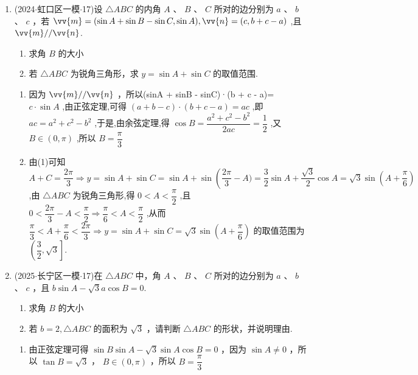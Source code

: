 \begin{enumerate}
    \item (2024$\cdot$虹口区一模$\cdot$17)设 $\bigtriangleup  {ABC}$ 的内角 $A$ 、 $B$ 、 $C$ 所对的边分别为 $a$ 、 $b$ 、 $c$ ，若 $\vv{m} = (\sin A + \sin B - \sin C,\sin A),\vv{n} = \left( {c,b + c - a}\right)$ ,且 $\vv{m}//\vv{n}$.
    \begin{enumerate}
        \item 求角 $B$ 的大小
        \item 若 $\bigtriangleup  {ABC}$ 为锐角三角形，求 $y = \sin A + \sin C$ 的取值范围.
    \end{enumerate}
    \begin{jieda}
        \begin{enumerate}
            \item 因为 $\vv{m}//\vv{n}$ ，所以(sinA + sinB - sinC)·(b + c - a)= $c \cdot  \sin A$ ,由正弦定理,可得 $\left( {a + b - c}\right)  \cdot  \left( {b + c - a}\right)  = {ac}$ ,即 ${ac} = {a}^{2} + {c}^{2} - {b}^{2}$ ,于是,由余弦定理,得 $\cos B = \dfrac{{a}^{2} + {c}^{2} - {b}^{2}}{2ac} =  \dfrac{1}{2}$ ,又 $B \in  \left( {0,\pi }\right)$ ,所以 $B = \dfrac{\pi }{3}$
            \item 由(1)可知 $A + C = \dfrac{2\pi }{3} \Longrightarrow  y = \sin A + \sin C = \sin A + \sin \left( {\dfrac{2\pi }{3} - }\right.  A) = \dfrac{3}{2}\sin A + \dfrac{\sqrt{3}}{2}\cos A = \sqrt{3}\sin \left( {A + \dfrac{\pi }{6}}\right)$ ,由 $\bigtriangleup {ABC}$ 为锐角三角形,得 $0 < A < \dfrac{\pi }{2}$ ,且 $0 < \dfrac{2\pi }{3} - A < \dfrac{\pi }{2} \Longrightarrow  \dfrac{\pi }{6} < A < \dfrac{\pi }{2}$ ,从而 $\dfrac{\pi }{3} < A + \dfrac{\pi }{6} < \dfrac{2\pi }{3} \Longrightarrow  y = \sin A + \sin C = \sqrt{3}\sin \left( {A + \dfrac{\pi }{6}}\right)$ 的取值范围为 $\left( {\dfrac{3}{2},\sqrt{3}}\right\rbrack$.
        \end{enumerate}
    \end{jieda}

    \item (2025$\cdot$长宁区一模$\cdot$17)在 $\bigtriangleup  {ABC}$ 中，角 $A$ 、 $B$ 、 $C$ 所对的边分别为 $a$ 、 $b$ 、 $c$ ，且 $b\sin A - \sqrt{3}a\cos B = 0$.
    \begin{enumerate}
        \item 求角 $B$ 的大小
        \item 若 $b = 2,{\bigtriangleup {ABC}}$ 的面积为 $\sqrt{3}$ ，请判断 ${\bigtriangleup {ABC}}$ 的形状，并说明理由.
    \end{enumerate}
    \begin{jieda}
        \begin{enumerate}
            \item 由正弦定理可得 $\sin B\sin A - \sqrt{3}\sin A\cos B = 0$ ，因为 $\sin A \neq  0$ ，所以 $\tan B = \sqrt{3}$ ， $B \in  \left( {0,\pi }\right)$ ，所以 $B = \dfrac{\pi }{3}$
            

\end{enumerate}
\end{jieda}
\end{enumerate}
